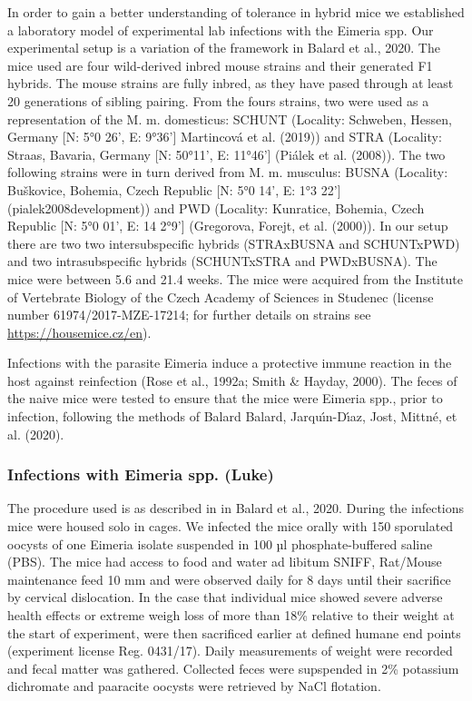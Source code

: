 \documentclass[
]{article}
\begin{document}
In order to gain a better understanding of tolerance in hybrid mice we
established a laboratory model of experimental lab infections with the
Eimeria spp. Our experimental setup is a variation of the framework in
Balard et al., 2020. The mice used are four wild-derived inbred mouse
strains and their generated F1 hybrids. The mouse strains are fully
inbred, as they have pased through at least 20 generations of sibling
pairing. From the fours strains, two were used as a representation of
the M. m. domesticus: SCHUNT (Locality: Schweben, Hessen, Germany {[}N:
5°0 26', E: 9°36'{]} Martincová et al. (2019)) and STRA (Locality:
Straas, Bavaria, Germany {[}N: 50°11', E: 11°46'{]} (Piálek et al.
(2008)). The two following strains were in turn derived from M. m.
musculus: BUSNA (Locality: Buškovice, Bohemia, Czech Republic {[}N: 5°0
14', E: 1°3 22'{]} (pialek2008development)) and PWD (Locality:
Kunratice, Bohemia, Czech Republic {[}N: 5°0 01', E: 14 2°9'{]}
(Gregorova, Forejt, et al. (2000)). In our setup there are two two
intersubspecific hybrids (STRAxBUSNA and SCHUNTxPWD) and two
intrasubspecific hybrids (SCHUNTxSTRA and PWDxBUSNA). The mice were
between 5.6 and 21.4 weeks. The mice were acquired from the Institute of
Vertebrate Biology of the Czech Academy of Sciences in Studenec (license
number 61974/2017-MZE-17214; for further details on strains see
\url{https://housemice.cz/en}).

Infections with the parasite Eimeria induce a protective immune reaction
in the host against reinfection (Rose et al., 1992a; Smith \& Hayday,
2000). The feces of the naive mice were tested to ensure that the mice
were Eimeria spp., prior to infection, following the methods of Balard
Balard, Jarquı́n-Dı́az, Jost, Mittné, et al. (2020).

\hypertarget{infections-with-eimeria-spp.-luke}{%
\subsubsection{Infections with Eimeria spp.
(Luke)}\label{infections-with-eimeria-spp.-luke}}

The procedure used is as described in in Balard et al., 2020. During the
infections mice were housed solo in cages. We infected the mice orally
with 150 sporulated oocysts of one Eimeria isolate suspended in 100 µl
phosphate-buffered saline (PBS). The mice had access to food and water
ad libitum SNIFF, Rat/Mouse maintenance feed 10 mm and were observed
daily for 8 days until their sacrifice by cervical dislocation. In the
case that individual mice showed severe adverse health effects or
extreme weigh loss of more than 18\% relative to their weight at the
start of experiment, were then sacrificed earlier at defined humane end
points (experiment license Reg. 0431/17). Daily measurements of weight
were recorded and fecal matter was gathered. Collected feces were
supspended in 2\% potassium dichromate and paaracite oocysts were
retrieved by NaCl flotation.
\end{document}
